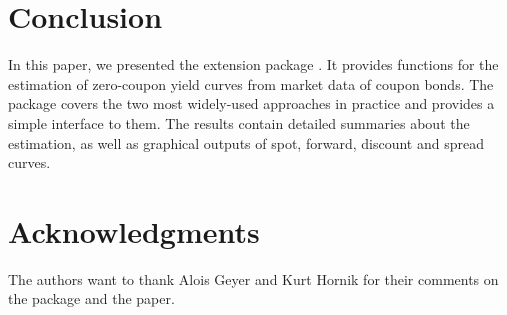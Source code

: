 \clearpage
\section{Conclusion}
\label{sec:conclusion}

In this paper, we presented the  extension package . It provides functions for the estimation of zero-coupon yield curves from market data of coupon bonds. The package covers the two most widely-used approaches in practice and provides a simple interface to them. The results contain detailed summaries about the estimation, as well as graphical outputs of spot, forward, discount and spread curves.

\section*{Acknowledgments}

The authors want to thank Alois Geyer and Kurt Hornik for their comments on the package and the paper.



